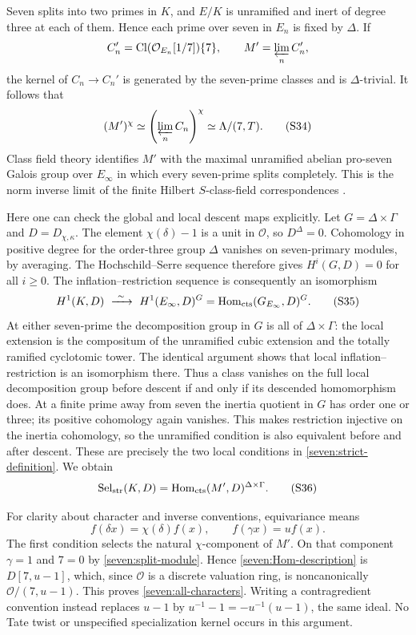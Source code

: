 Seven splits into two primes in $K$, and $E/K$ is unramified and inert of
degree three at each of them. Hence each prime over seven in $E_n$ is fixed
by $\Delta$.
If
\[
 C_n'=\operatorname{Cl}(\mathcal O_{E_n}[1/7])\{7\},
 \qquad M'=\varprojlim_n C_n',
\]
the kernel of $C_n\to C_n'$ is generated by the seven-prime classes and
is $\Delta$-trivial. It follows that
\[
 (M')^\chi
 \simeq\left(\varprojlim_n C_n\right)^\chi
 \simeq\Lambda/(7,T).
 \tag{S34}\label{seven:split-module}
\]
Class field theory identifies $M'$ with the maximal unramified abelian
pro-seven Galois group over $E_\infty$ in which every seven-prime splits
completely. This is the norm inverse limit of the finite Hilbert
$S$-class-field correspondences
\cite[Remark~1.3.21 and Proposition~3.2.20]{sevenSharifi}.

Here one can check the global and local descent maps explicitly.
Let $G=\Delta\times\Gamma$ and $D=D_{\chi,\kappa}$.
The element $\chi(\delta)-1$ is a unit in $\mathcal O$, so $D^\Delta=0$.
Cohomology in positive degree for the order-three group $\Delta$ vanishes
on seven-primary modules, by averaging.
The Hochschild--Serre sequence therefore gives
$H^i(G,D)=0$ for all $i\ge0$.
The inflation--restriction sequence is consequently an isomorphism
\[
 H^1(K,D)\ \xrightarrow{\ \sim\ }\
 H^1(E_\infty,D)^G
 =\operatorname{Hom}_{\rm cts}(G_{E_\infty},D)^G.
 \tag{S35}\label{seven:global-inflation}
\]
At either seven-prime the decomposition group in $G$ is all of
$\Delta\times\Gamma$: the local extension is the compositum of the
unramified cubic extension and the totally ramified cyclotomic tower.
The identical argument shows that local inflation--restriction is an
isomorphism there. Thus a class vanishes on the full local decomposition
group before descent if and only if its descended homomorphism does.
At a finite prime away from seven the inertia quotient in $G$ has order
one or three; its positive cohomology again vanishes. This makes
restriction injective on the inertia cohomology, so the unramified
condition is also equivalent before and after descent.
These are precisely the two local conditions in
\eqref{seven:strict-definition}. We obtain
\[
 \operatorname{Sel}_{\rm str}(K,D)
 =\operatorname{Hom}_{\rm cts}(M',D)^{\Delta\times\Gamma}.
 \tag{S36}\label{seven:Hom-description}
\]

For clarity about character and inverse conventions, equivariance means
\[
 f(\delta x)=\chi(\delta)f(x),\qquad f(\gamma x)=u f(x).
 \tag{S37}\label{seven:orientation}
\]
The first condition selects the natural $\chi$-component of $M'$.
On that component $\gamma=1$ and $7=0$ by \eqref{seven:split-module}.
Hence \eqref{seven:Hom-description} is $D[7,u-1]$, which, since
$\mathcal O$ is a discrete valuation ring, is noncanonically
$\mathcal O/(7,u-1)$.
This proves \eqref{seven:all-characters}.
Writing a contragredient convention instead replaces $u-1$ by
$u^{-1}-1=-u^{-1}(u-1)$, the same ideal. No Tate twist or unspecified
specialization kernel occurs in this argument.


